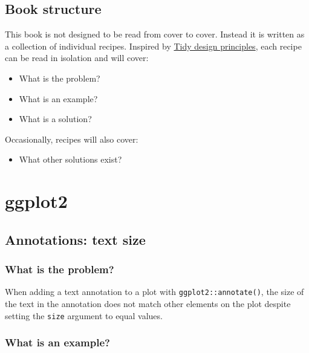 \documentclass[
  letterpaper,
  DIV=11,
  numbers=noendperiod]{scrreprt}
\providecommand{\tightlist}{%
  \setlength{\itemsep}{0pt}\setlength{\parskip}{0pt}}\usepackage{longtable,booktabs,array}
\begin{document}

\hypertarget{book-structure}{%
\chapter*{Book structure}\label{book-structure}}


This book is not designed to be read from cover to cover. Instead it is
written as a collection of individual recipes. Inspired by
\href{https://design.tidyverse.org/}{Tidy design principles}, each
recipe can be read in isolation and will cover:

\begin{itemize}
\item
  What is the problem?
\item
  What is an example?
\item
  What is a solution?
\end{itemize}

Occasionally, recipes will also cover:

\begin{itemize}
\tightlist
\item
  What other solutions exist?
\end{itemize}

\part{ggplot2}

\hypertarget{annotations-text-size}{%
\chapter{Annotations: text size}\label{annotations-text-size}}

\hypertarget{what-is-the-problem}{%
\section{What is the problem?}\label{what-is-the-problem}}

When adding a text annotation to a plot with
\texttt{ggplot2::annotate()}, the size of the text in the annotation
does not match other elements on the plot despite setting the
\texttt{size} argument to equal values.

\hypertarget{what-is-an-example}{%
\section{What is an example?}\label{what-is-an-example}}
\end{document}
